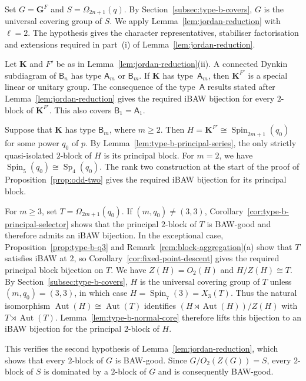 \documentclass[10pt]{amsart}
\theoremstyle{definition}
\renewcommand{\geq}{\geqslant}
\let\oldendproof\endproof
\renewenvironment{proof}[1][\proofname]{%
  \oldproof[\bfseries #1]%
}{\oldendproof}
\DeclareMathOperator{\Aut}{Aut}
\DeclareMathOperator{\Sp}{Sp}
\numberwithin{equation}{section}
\numberwithin{table}{section}
\begin{document}
\begin{proof}
Set $G=\mathbf G^F$ and $S=\Omega_{2n+1}(q)$. By
Section~\ref{subsec:type-b-covers}, $G$ is the universal covering group of $S$.
We apply Lemma~\ref{lem:jordan-reduction} with $\ell=2$.
The hypothesis gives the character representatives, stabiliser
factorisation and extensions required in part~\textup{(i)} of
Lemma~\ref{lem:jordan-reduction}.

Let $\mathbf K$ and $F'$ be as in
Lemma~\ref{lem:jordan-reduction}\textup{(ii)}. A connected Dynkin
subdiagram of $\mathsf B_n$ has type $\mathsf A_m$ or $\mathsf B_m$.
If $\mathbf K$ has type~$\mathsf A_m$, then $\mathbf K^{F'}$ is a
special linear or unitary group. The consequence of the type~$\mathsf A$ results stated after
Lemma~\ref{lem:jordan-reduction} gives the required iBAW bijection
for every $2$-block of $\mathbf K^{F'}$. This also covers $\mathsf B_1=\mathsf A_1$.

Suppose that $\mathbf K$ has type $\mathsf B_m$, where $m\geq2$.
Then $H=\mathbf K^{F'}\cong\operatorname{Spin}_{2m+1}(q_0)$ for some
power $q_0$ of $p$. By Lemma~\ref{lem:type-b-principal-series},
the only strictly quasi-isolated $2$-block of $H$ is its principal block.
For $m=2$, we have $\operatorname{Spin}_5(q_0)\cong\Sp_4(q_0)$.
The rank two construction at the start of the proof of
Proposition~\ref{prop:odd-two} gives the required iBAW bijection
for its principal block.

For $m\geq3$, set $T=\Omega_{2m+1}(q_0)$.
If $(m,q_0)\neq(3,3)$, Corollary~\ref{cor:type-b-principal-selector}
shows that the principal $2$-block of $T$ is BAW-good and therefore
admits an iBAW bijection. In the exceptional case, Proposition~\ref{prop:type-b-q3}
and Remark~\ref{rem:block-aggregation}\textup{(a)} show that $T$ satisfies iBAW at
$2$, so Corollary~\ref{cor:fixed-point-descent} gives the required
principal block bijection on $T$.
We have $Z(H)=O_2(H)$ and $H/Z(H)\cong T$.
By Section~\ref{subsec:type-b-covers}, $H$ is the universal covering group of
$T$ unless $(m,q_0)=(3,3)$, in which case
$H=\operatorname{Spin}_7(3)=X_3(T)$. Thus the natural isomorphism
$\Aut(H)\cong\Aut(T)$ identifies $(H\rtimes\Aut(H))/Z(H)$ with
$T\rtimes\Aut(T)$.
Lemma~\ref{lem:type-b-normal-core} therefore lifts this bijection to
an iBAW bijection for the principal $2$-block of $H$.

This verifies the second hypothesis of Lemma~\ref{lem:jordan-reduction},
which shows that every $2$-block of $G$ is BAW-good.
Since $G/O_2(Z(G))=S$, every $2$-block of $S$ is dominated by a
$2$-block of $G$ and is consequently BAW-good.
\end{proof}
\end{document}
